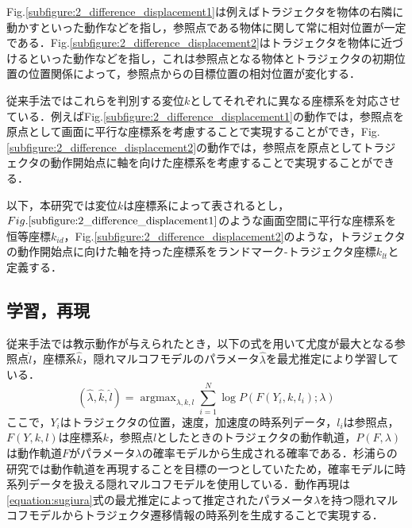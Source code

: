 \clearpage
Fig.\ref{subfigure:2_difference_displacement1}は例えばトラジェクタを物体の右隣に動かすといった動作などを指し，参照点である物体に関して常に相対位置が一定である．Fig.\ref{subfigure:2_difference_displacement2}はトラジェクタを物体に近づけるといった動作などを指し，これは参照点となる物体とトラジェクタの初期位置の位置関係によって，参照点からの目標位置の相対位置が変化する．

従来手法ではこれらを判別する変位$k$としてそれぞれに異なる座標系を対応させている．例えばFig.\ref{subfigure:2_difference_displacement1}の動作では，参照点を原点として画面に平行な座標系を考慮することで実現することができ，Fig.\ref{subfigure:2_difference_displacement2}の動作では，参照点を原点としてトラジェクタの動作開始点に軸を向けた座標系を考慮することで実現することができる．

以下，本研究では変位$k$は座標系によって表されるとし，$Fig.\ref{subfigure:2_difference_displacement1}$のような画面空間に平行な座標系を恒等座標$k_{id}$，Fig.\ref{subfigure:2_difference_displacement2}のような，トラジェクタの動作開始点に向けた軸を持った座標系をランドマーク-トラジェクタ座標$k_{lt}$と定義する．

\subsection{学習，再現}

従来手法では教示動作が与えられたとき，以下の式を用いて尤度が最大となる参照点$\hat{l}$，座標系$\hat{k}$，隠れマルコフモデルのパラメータ$\hat{λ}$を最尤推定により学習している．
\begin{equation}
	\label{equation:sugiura}
	(\hat{λ} , \hat{k} , \hat{l}) = \mathop{\arg\max}_{λ , k , l}\sum_{i=1}^{N}\log P(F(Y_{i} , k , l_{i}) ; λ)
\end{equation}
ここで，$Y_{i}$はトラジェクタの位置，速度，加速度の時系列データ，$l_{i}$は参照点，$F(Y , k , l)$は座標系$k$，参照点$l$としたときのトラジェクタの動作軌道，$P(F,λ)$は動作軌道$F$がパラメータ$λ$の確率モデルから生成される確率である．杉浦らの研究では動作軌道を再現することを目標の一つとしていたため，確率モデルに時系列データを扱える隠れマルコフモデルを使用している．動作再現は\ref{equation:sugiura}式の最尤推定によって推定されたパラメータ$λ$を持つ隠れマルコフモデルからトラジェクタ遷移情報の時系列を生成することで実現する．
